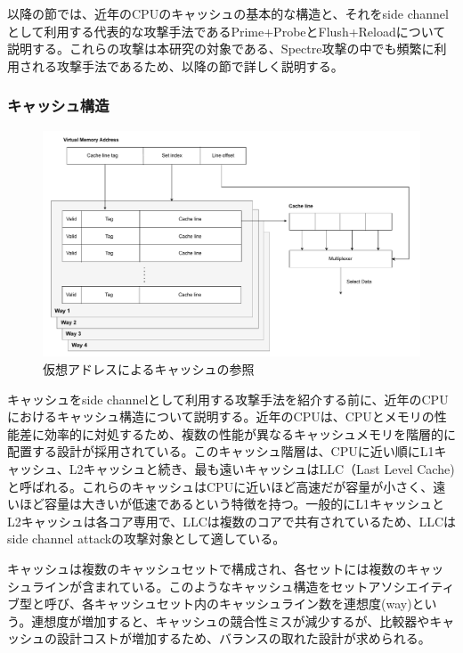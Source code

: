 以降の節では、近年のCPUのキャッシュの基本的な構造と、それをside channelとして利用する代表的な攻撃手法であるPrime+Probe\cite{tromer2010efficient}とFlush+Reload\cite{yarom2014flush+}について説明する。これらの攻撃は本研究の対象である、Spectre攻撃の中でも頻繁に利用される攻撃手法であるため、以降の節で詳しく説明する。

\subsubsection{キャッシュ構造}

\begin{figure}[tb]
  \centering
  \includegraphics[width=\linewidth]{img/cache.drawio.pdf}
  \caption{仮想アドレスによるキャッシュの参照}\label{fig:cache-overview}
\end{figure}

キャッシュをside channelとして利用する攻撃手法を紹介する前に、近年のCPUにおけるキャッシュ構造について説明する。近年のCPUは、CPUとメモリの性能差に効率的に対処するため、複数の性能が異なるキャッシュメモリを階層的に配置する設計が採用されている。このキャッシュ階層は、CPUに近い順にL1キャッシュ、L2キャッシュと続き、最も遠いキャッシュはLLC（Last Level Cache)と呼ばれる。これらのキャッシュはCPUに近いほど高速だが容量が小さく、遠いほど容量は大きいが低速であるという特徴を持つ。一般的にL1キャッシュとL2キャッシュは各コア専用で、LLCは複数のコアで共有されているため、LLCはside channel attackの攻撃対象として適している。\par

キャッシュは複数のキャッシュセットで構成され、各セットには複数のキャッシュラインが含まれている。このようなキャッシュ構造をセットアソシエイティブ型と呼び、各キャッシュセット内のキャッシュライン数を連想度(way)という。連想度が増加すると、キャッシュの競合性ミスが減少するが、比較器やキャッシュの設計コストが増加するため、バランスの取れた設計が求められる。\par

